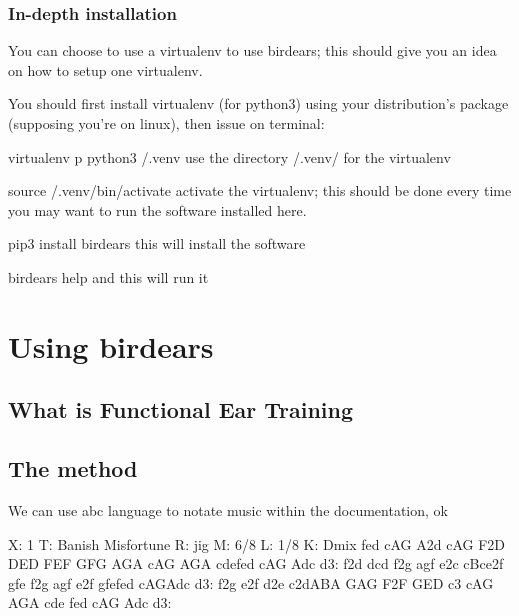 \documentclass[letterpaper,10pt,english]{sphinxmanual}
\begin{document}
\subsection{In-depth installation}
\label{\detokenize{index:in-depth-installation}}
You can choose to use a virtualenv to use birdears; this should give you
an idea on how to setup one virtualenv.

You should first install virtualenv (for python3) using your
distribution’s package (supposing you’re on linux), then issue on terminal:

%
\begin{sphinxVerbatim}[commandchars=\\\{\}]
virtualenv \PYGZhy{}p python3 \PYGZti{}/.venv \PYGZsh{} use the directory \PYGZti{}/.venv/ for the virtualenv

source \PYGZti{}/.venv/bin/activate   \PYGZsh{} activate the virtualenv; this should be done
                              \PYGZsh{} every time you may want to run the software
                              \PYGZsh{} installed here.

pip3 install birdears         \PYGZsh{} this will install the software

birdears \PYGZhy{}\PYGZhy{}help               \PYGZsh{} and this will run it
\end{sphinxVerbatim}


\chapter{Using birdears}
\label{\detokenize{index:using-birdears}}

\section{What is Functional Ear Training}
\label{\detokenize{index:what-is-functional-ear-training}}


\section{The method}
\label{\detokenize{index:the-method}}
We can use abc language to notate music within the documentation, ok

%
\begin{sphinxVerbatim}[commandchars=\\\{\}]
X: 1
T: Banish Misfortune
R: jig
M: 6/8
L: 1/8
K: Dmix
fed cAG\textbar{} A2d cAG\textbar{} F2D DED\textbar{} FEF GFG\textbar{}
AGA cAG\textbar{} AGA cde\textbar{}fed cAG\textbar{} Ad\PYGZca{}c d3:\textbar{}
f2d d\PYGZca{}cd\textbar{} f2g agf\textbar{} e2c cBc\textbar{}e2f gfe\textbar{}
f2g agf\textbar{} e2f gfe\textbar{}fed cAG\textbar{}Ad\PYGZca{}c d3:\textbar{}
f2g e2f\textbar{} d2e c2d\textbar{}ABA GAG\textbar{} F2F GED\textbar{}
c3 cAG\textbar{} AGA cde\textbar{} fed cAG\textbar{} Ad\PYGZca{}c d3:\textbar{}
\end{sphinxVerbatim}
\end{document}
